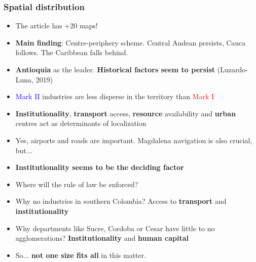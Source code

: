 \documentclass{beamer}
\begin{document}
	\begin{frame}[allowframebreaks]
		\frametitle{Spatial distribution}
		\begin{itemize}
			\item The article has +20 maps!
			\item \textbf{Main finding}: Centre-periphery scheme. Central Andean persists, Cauca follows. The Caribbean falls behind.
			\item \textbf{Antioquia} as the leader. \textbf{Historical factors seem to persist} (Luzardo-Luna, 2019)
			\item \textcolor{blue}{Mark II} industries are less disperse in the territory than \textcolor{red}{Mark I}
			\item \textbf{Institutionality}, \textbf{transport} access, \textbf{resource} availability and \textbf{urban} centres act as determinants of localization
			\item Yes, airports and roads are important. Magdalena navigation is also crucial, but...
			\framebreak
			\item \textbf{Institutionality seems to be the deciding factor}
			\item Where will the rule of law be enforced?
			\item Why no industries in southern Colombia? Access to \textbf{transport} and \textbf{institutionality}
			\item Why departments like Sucre, Cordoba or Cesar have little to no agglomerations? \textbf{Institutionality} and \textbf{human capital}
			\item So... \textbf{not one size fits all} in this matter.
		\end{itemize}
	\end{frame}
\end{document}
